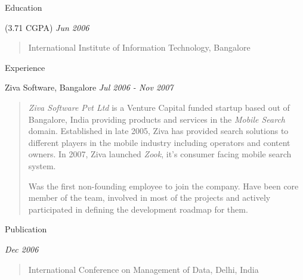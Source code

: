\documentclass{resume}
\author{Siddhartha Reddy Kothakapu}
\newcommand{\period}{\hfill\small\sl}
\begin{document}
 \maketitle

\begin{category}{Education}

     {\footnotesize(3.71 CGPA)}
    {\period Jun 2006} \begin{quote} International Institute of Information
        Technology, Bangalore \end{quote}

\end{category}


\begin{category}{Experience}

     Ziva Software, Bangalore {\period Jul 2006 - Nov 2007}
    \begin{quotation}
        {\em Ziva Software Pvt Ltd} is a Venture Capital funded startup based
        out of Bangalore, India providing products and services in the {\em
        Mobile Search} domain. Established in late 2005, Ziva has provided
        search solutions to different players in the mobile industry including
        operators and content owners. In 2007, Ziva launched {\em Zook}, it's
        consumer facing mobile search system.

        Was the first non-founding employee to join the company. Have been core
        member of the team, involved in most of the projects and actively
        participated in defining the development roadmap for them.
    \end{quotation}

\end{category}


\begin{category}{Publication}

     {\period Dec 2006}
    \begin{quote}
        International Conference on Management of Data, Delhi, India
    \end{quote}

\end{category}
\end{document}
